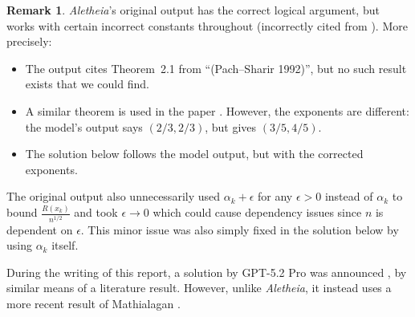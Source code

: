 \documentclass{article}
\theoremstyle{plain}
\theoremstyle{definition}
\newtheorem{remark}{Remark}[section]
\newcommand{\Aletheia}{\emph{Aletheia}}
\begin{document}
\begin{remark}
\Aletheia's original output has the correct logical argument, but works with certain incorrect constants throughout (incorrectly cited from \cite{PS98}). More precisely: 
\begin{itemize}
    \item The output cites Theorem~2.1 from ``(Pach--Sharir 1992)'', but no such result exists that we could find. 
    \item A similar theorem is used in the paper \cite{PS98}.
    However, the exponents are different: the model's output says \((2/3,2/3)\), but \cite{PS98} gives \((3/5,4/5)\).
    \item The solution below follows the model output, but with the corrected exponents. 
\end{itemize}
The original output also unnecessarily used $\alpha_{k}+\epsilon$ for any $\epsilon>0$ instead of $\alpha_{k}$ to bound $\frac{R(x_{k})}{n^{1/2}}$ and took $\epsilon\to 0$ which could cause dependency issues since $n$ is dependent on $\epsilon$. This minor issue was also simply fixed in the solution below by using $\alpha_{k}$ itself.

During the writing of this report, a solution by GPT-5.2 Pro was announced \cite{ErdosLLMHunter652}, by similar means of a literature result. However, unlike {\Aletheia}, it instead uses a more recent result of Mathialagan \cite[Theorem 3.6]{mathialagan2019bipartitedistinctdistancesplane}.
\end{remark}
 
\end{document}
